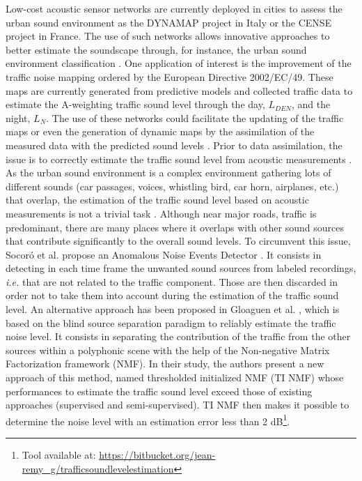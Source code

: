 \documentclass[12pt,english,twoside]{article}
\begin{document}
Low-cost acoustic sensor networks are currently deployed in cities to assess the urban sound environment as the DYNAMAP project \cite{dynamap_2016} in Italy or the CENSE project \cite{picaut2017characterization} in France. The use of such networks allows innovative approaches to better estimate the soundscape through, for instance, the urban sound environment classification \cite{maijala2018environmental}. One application of interest is the improvement of the traffic noise mapping ordered by the European Directive 2002/EC/49. These maps are currently generated from predictive models and collected traffic data to estimate the A-weighting traffic sound level through the day, $L_{DEN}$, and the night, $L_N$. The use of these networks could facilitate the updating of the traffic maps or even the generation of dynamic maps by the assimilation of the measured data with the predicted sound levels \cite{ventura2018assimilation}. 
Prior to data assimilation, the issue is to correctly estimate the traffic sound level from acoustic measurements \cite{leiba2017large,socoro2017anomalous}. As the urban sound environment is a complex environment gathering lots of different sounds (car passages, voices, whistling bird, car horn, airplanes, etc.) that overlap, the estimation of the traffic sound level  based on acoustic measurements is not a trivial task \cite{mesaros_sound_2015}. Although near major roads, traffic is predominant, there are many places where it overlaps with other sound sources that contribute significantly to the overall sound levels. To circumvent this issue, Socor\'o et al. propose an Anomalous Noise Events Detector \cite{socoro2017anomalous}. It consists in detecting in each time frame the unwanted sound sources from labeled recordings, \textit{i.e.} that are not related to the traffic component. Those are then discarded in order not to take them into account during the estimation of the traffic sound level.
An alternative approach has been proposed in Gloaguen et al. \cite{gloaguen2019road}, which is based on the blind source separation paradigm to reliably estimate the traffic noise level. 
It consists in separating the contribution of the traffic from the other sources within a polyphonic scene with the help of the Non-negative Matrix Factorization framework (NMF). 
In their study, the authors present a new approach of this method, named thresholded initialized NMF (TI NMF) whose performances to  estimate the traffic sound level exceed those of existing approaches (supervised and semi-supervised). TI NMF then makes it possible to determine the noise level with an estimation error less than 2 dB\footnote{Tool available at: \url{https://bitbucket.org/jean-remy_g/trafficsoundlevelestimation}}. 
\end{document}
